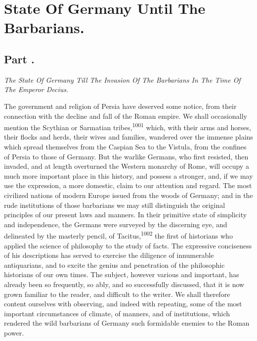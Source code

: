 \chapter{State Of Germany Until The Barbarians.}
\section{Part \thesection.}

\textit{The State Of Germany Till The Invasion Of The Barbarians In The
Time Of The Emperor Decius.}
\vspace{\onelineskip}

The government and religion of Persia have deserved some notice,
from their connection with the decline and fall of the Roman
empire. We shall occasionally mention the Scythian or Sarmatian
tribes,\textsuperscript{1001} which, with their arms and horses, their flocks and
herds, their wives and families, wandered over the immense plains
which spread themselves from the Caspian Sea to the Vistula, from
the confines of Persia to those of Germany. But the warlike
Germans, who first resisted, then invaded, and at length
overturned the Western monarchy of Rome, will occupy a much more
important place in this history, and possess a stronger, and, if
we may use the expression, a more domestic, claim to our
attention and regard. The most civilized nations of modern Europe
issued from the woods of Germany; and in the rude institutions of
those barbarians we may still distinguish the original principles
of our present laws and manners. In their primitive state of
simplicity and independence, the Germans were surveyed by the
discerning eye, and delineated by the masterly pencil, of
Tacitus,\textsuperscript{1002} the first of historians who applied the science of
philosophy to the study of facts. The expressive conciseness of
his descriptions has served to exercise the diligence of
innumerable antiquarians, and to excite the genius and
penetration of the philosophic historians of our own times. The
subject, however various and important, has already been so
frequently, so ably, and so successfully discussed, that it is
now grown familiar to the reader, and difficult to the writer. We
shall therefore content ourselves with observing, and indeed with
repeating, some of the most important circumstances of climate,
of manners, and of institutions, which rendered the wild
barbarians of Germany such formidable enemies to the Roman power.

